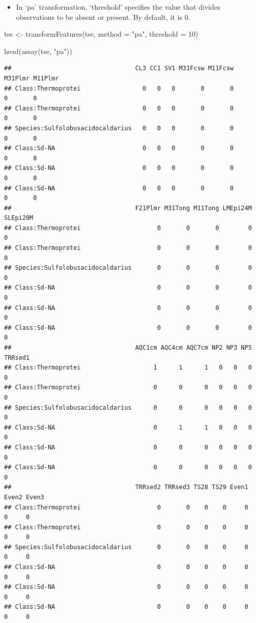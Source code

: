 \documentclass[
]{book}
\newenvironment{Shaded}{\begin{snugshade}}{\end{snugshade}}
\newcommand{\AttributeTok}[1]{\textcolor[rgb]{0.77,0.63,0.00}{#1}}
\newcommand{\DecValTok}[1]{\textcolor[rgb]{0.00,0.00,0.81}{#1}}
\newcommand{\FunctionTok}[1]{\textcolor[rgb]{0.00,0.00,0.00}{#1}}
\newcommand{\NormalTok}[1]{#1}
\newcommand{\OtherTok}[1]{\textcolor[rgb]{0.56,0.35,0.01}{#1}}
\newcommand{\StringTok}[1]{\textcolor[rgb]{0.31,0.60,0.02}{#1}}
\providecommand{\tightlist}{%
  \setlength{\itemsep}{0pt}\setlength{\parskip}{0pt}}
\begin{document}
\begin{itemize}
\tightlist
\item
  In `pa' transformation, `threshold' specifies the value that divides observations to
  be absent or present. By default, it is 0.
\end{itemize}

\begin{Shaded}
\begin{Highlighting}[]
\NormalTok{tse }\OtherTok{\textless{}{-}} \FunctionTok{transformFeatures}\NormalTok{(tse, }\AttributeTok{method =} \StringTok{"pa"}\NormalTok{, }\AttributeTok{threshold =} \DecValTok{10}\NormalTok{)}

\FunctionTok{head}\NormalTok{(}\FunctionTok{assay}\NormalTok{(tse, }\StringTok{"pa"}\NormalTok{))}
\end{Highlighting}
\end{Shaded}

\begin{verbatim}
##                                  CL3 CC1 SV1 M31Fcsw M11Fcsw M31Plmr M11Plmr
## Class:Thermoprotei                 0   0   0       0       0       0       0
## Class:Thermoprotei                 0   0   0       0       0       0       0
## Species:Sulfolobusacidocaldarius   0   0   0       0       0       0       0
## Class:Sd-NA                        0   0   0       0       0       0       0
## Class:Sd-NA                        0   0   0       0       0       0       0
## Class:Sd-NA                        0   0   0       0       0       0       0
##                                  F21Plmr M31Tong M11Tong LMEpi24M SLEpi20M
## Class:Thermoprotei                     0       0       0        0        0
## Class:Thermoprotei                     0       0       0        0        0
## Species:Sulfolobusacidocaldarius       0       0       0        0        0
## Class:Sd-NA                            0       0       0        0        0
## Class:Sd-NA                            0       0       0        0        0
## Class:Sd-NA                            0       0       0        0        0
##                                  AQC1cm AQC4cm AQC7cm NP2 NP3 NP5 TRRsed1
## Class:Thermoprotei                    1      1      1   0   0   0       0
## Class:Thermoprotei                    0      0      0   0   0   0       0
## Species:Sulfolobusacidocaldarius      0      0      0   0   0   0       0
## Class:Sd-NA                           0      1      1   0   0   0       0
## Class:Sd-NA                           0      0      0   0   0   0       0
## Class:Sd-NA                           0      0      0   0   0   0       0
##                                  TRRsed2 TRRsed3 TS28 TS29 Even1 Even2 Even3
## Class:Thermoprotei                     0       0    0    0     0     0     0
## Class:Thermoprotei                     0       0    0    0     0     0     0
## Species:Sulfolobusacidocaldarius       0       0    0    0     0     0     0
## Class:Sd-NA                            0       0    0    0     0     0     0
## Class:Sd-NA                            0       0    0    0     0     0     0
## Class:Sd-NA                            0       0    0    0     0     0     0
\end{verbatim}
\end{document}
